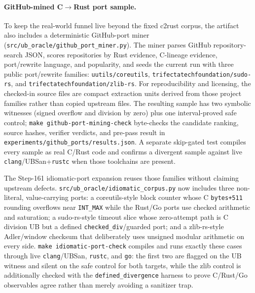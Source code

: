\documentclass[10pt,a4paper]{article}
\begin{document}
\paragraph{GitHub-mined C$\to$Rust port sample.}
To keep the real-world funnel live beyond the fixed c2rust corpus, the artifact
also includes a deterministic GitHub-port miner
(\texttt{src/ub\_oracle/github\_port\_miner.py}). The miner parses GitHub
repository-search JSON, scores repositories by Rust evidence, C-lineage evidence,
port/rewrite language, and popularity, and seeds the current run with three
public port/rewrite families: \texttt{uutils/coreutils},
\texttt{trifectatechfoundation/sudo-rs}, and
\texttt{trifectatechfoundation/zlib-rs}. For reproducibility and licensing, the
checked-in source files are compact extraction units derived from those project
families rather than copied upstream files. The resulting sample has two symbolic
witnesses (signed overflow and division by zero) plus one interval-proved safe
control; \texttt{make github-port-mining-check} byte-checks the candidate ranking,
source hashes, verifier verdicts, and pre-pass result in
\texttt{experiments/github\_ports/results.json}. A separate skip-gated test
compiles every sample as real C/Rust code and confirms a divergent sample against
live \texttt{clang}/UBSan+\texttt{rustc} when those toolchains are present.

The Step-161 idiomatic-port expansion reuses those families without claiming
upstream defects.  \texttt{src/ub\_oracle/idiomatic\_corpus.py} now includes three
non-literal, value-carrying ports: a coreutils-style block counter whose C
\texttt{bytes+511} rounding overflows near \texttt{INT\_MAX} while the Rust/Go
ports use checked arithmetic and saturation; a sudo-rs-style timeout slice whose
zero-attempt path is C division UB but a defined \texttt{checked\_div}/guarded
port; and a zlib-rs-style Adler/window checksum that deliberately uses unsigned
modular arithmetic on every side.  \texttt{make idiomatic-port-check} compiles and
runs exactly these cases through live \texttt{clang}/UBSan, \texttt{rustc}, and
\texttt{go}: the first two are flagged on the UB witness and silent on the safe
control for both targets, while the zlib control is additionally checked with the
\texttt{defined\_divergence} harness to prove C/Rust/Go observables agree rather
than merely avoiding a sanitizer trap.
\end{document}
